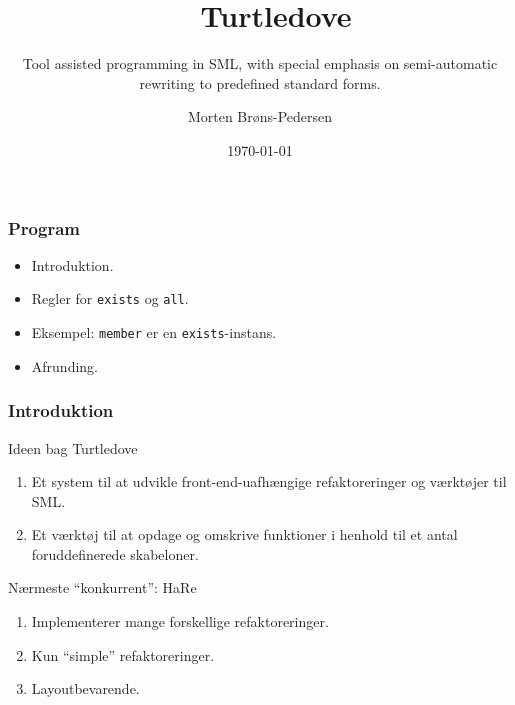 \documentclass[slidestop,compress,mathserif, xcolor=dvipsnames]{beamer}
\title[]{\ \ Turtledove}
\subtitle{\tiny{Tool assisted programming in SML, with special emphasis on
    semi-automatic\\ rewriting to predefined standard forms.}}
\author{Morten Brøns-Pedersen}
\institute[DIKU]{Department of Computer Science}
\date[]{\today}
\newcommand{\ttt}[1]{\texttt{#1}}
\begin{document}
\frame[plain]{\titlepage}


\begin{frame}[c]
  \frametitle{Program}

  \begin{itemize}
  \item Introduktion.
  \item Regler for \ttt{exists} og \ttt{all}.
  \item Eksempel: \ttt{member} er en \ttt{exists}-instans.
  \item Afrunding.
  \end{itemize}

\end{frame}

\begin{frame}
  \frametitle{Introduktion}

  Ideen bag Turtledove
    \begin{enumerate}
    \item Et system til at udvikle front-end-uafhængige
      refaktoreringer og værktøjer til SML.
    \item Et værktøj til at opdage og omskrive funktioner i henhold til et antal
      foruddefinerede skabeloner.
    \end{enumerate}
  Nærmeste "`konkurrent"': HaRe
  \begin{enumerate}
  \item Implementerer mange forskellige refaktoreringer.
  \item Kun "`simple"' refaktoreringer.
  \item Layoutbevarende.
  \end{enumerate}
\end{frame}
\end{document}
